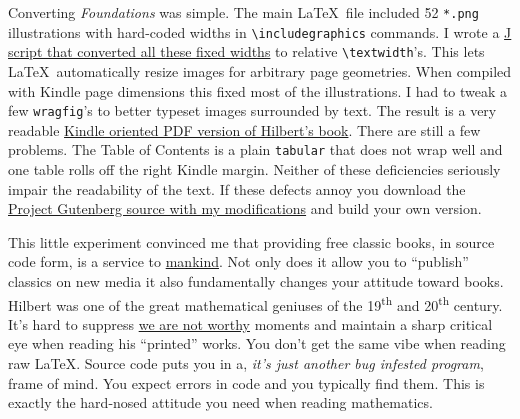 Converting \emph{Foundations} was simple. The main \LaTeX\ file
included 52 \texttt{*.png} illustrations with hard-coded widths in
\verb|\includegraphics| commands. I wrote a
\href{https://github.com/bakerjd99/jacks/blob/master/hilbert/RescaleHilbertGraphics.ijs}{J script that
converted all these fixed widths} to relative
\verb|\textwidth|'s. This lets \LaTeX\ automatically
resize images for arbitrary page geometries. When compiled with Kindle
page dimensions this fixed most of the illustrations. I had to tweak a
few \texttt{wragfig}'s to better typeset images surrounded by text. The result is
a very readable
\href{https://github.com/bakerjd99/jacks/blob/master/hilbert/hilbert_kindle.pdf}{Kindle oriented
PDF version of Hilbert's book}. There are still a few problems. The
Table of Contents is a plain \texttt{tabular} that does not wrap well and one
table rolls off the right Kindle margin. Neither of these deficiencies
seriously impair the readability of the text. If these defects annoy you
download the
\href{https://github.com/bakerjd99/jacks/blob/master/hilbert/hilbert_foundations_of_geometry_source.zip}{Project Gutenberg
source with my modifications} and build your own version.

This little experiment convinced me that providing free classic books,
in source code form, is a service to
\href{http://www.articlesbase.com/writing-articles/is-mankind-sexist-1836076.html}{mankind}.
Not only does it allow you to ``publish'' classics on new media it also
fundamentally changes your attitude toward books. Hilbert was one of the
great mathematical geniuses of the 19\textsuperscript{th} and 20\textsuperscript{th} century. It's hard to
suppress \href{http://www.youtube.com/watch?v=-FucbvoFFy0}{we are not
worthy} moments and maintain a sharp critical eye when reading his
``printed'' works. You don't get the same vibe when reading raw
\LaTeX. Source code puts you in a, \emph{it's just another bug
infested program}, frame of mind. You expect errors in code and you
typically find them. This is exactly the hard-nosed attitude you need
when reading mathematics.




%